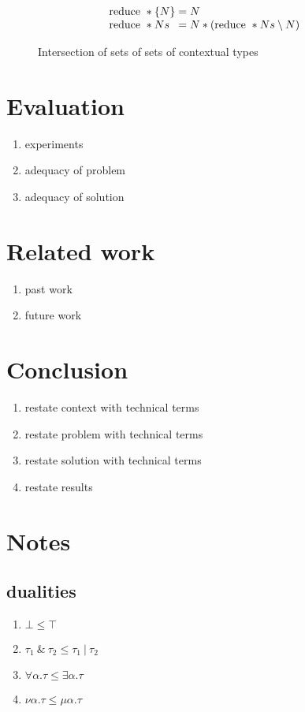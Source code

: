\documentclass[sigplan,screen]{acmart}
\begin{document}
\begin{figure}[h]
  \[
    \begin{array}{l @{}l}
    \text{reduce } * \{ N \}
    & {}= N
    \\
    \text{reduce } * Ns
    & {}= N * (\text{reduce } * Ns \setminus N)
    \end{array}
  \]

  \caption{Intersection of sets of sets of contextual types}
\end{figure}




\section{Evaluation}
\begin{enumerate}
  \item experiments 
  \item adequacy of problem 
  \item adequacy of solution 
\end{enumerate}

\section{Related work}
\begin{enumerate}
  \item past work 
  \item future work 
\end{enumerate}

\section{Conclusion}
\begin{enumerate}
  \item restate context with technical terms 
  \item restate problem with technical terms 
  \item restate solution with technical terms 
  \item restate results 
\end{enumerate}

\section*{Notes}

\subsection*{dualities}
\begin{enumerate}
  \item \(\bot \leq \top \)
  \item \(\tau_1\ \&\ \tau_2  \leq \tau_1\ |\ \tau_2 \)
  \item \(\forall \alpha . \tau \leq \exists \alpha . \tau \)
  \item \(\nu \alpha . \tau \leq \mu \alpha . \tau \)
\end{enumerate}
\end{document}
